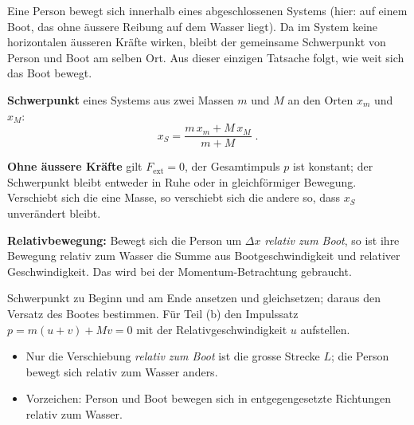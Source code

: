 
Eine Person bewegt sich innerhalb eines abgeschlossenen Systems (hier: auf
einem Boot, das ohne äussere Reibung auf dem Wasser liegt). Da im System
keine horizontalen äusseren Kräfte wirken, bleibt der gemeinsame Schwerpunkt
von Person und Boot am selben Ort. Aus dieser einzigen Tatsache folgt, wie
weit sich das Boot bewegt.

\begin{werkzeugkasten}[Werkzeuge]
\textbf{Schwerpunkt} eines Systems aus zwei Massen $m$ und $M$ an den Orten
$x_m$ und $x_M$:
\begin{equation}
  x_S = \frac{m\,x_m + M\,x_M}{m+M}\;.
\end{equation}

\textbf{Ohne äussere Kräfte} gilt $F_\mathrm{ext}=0$, der Gesamtimpuls $p$
ist konstant; der Schwerpunkt bleibt entweder in Ruhe oder in gleichförmiger
Bewegung. Verschiebt sich die eine Masse, so verschiebt sich die andere so,
dass $x_S$ unverändert bleibt.

\textbf{Relativbewegung:} Bewegt sich die Person um $\Delta x$ \emph{relativ
zum Boot}, so ist ihre Bewegung relativ zum Wasser die Summe aus
Bootgeschwindigkeit und relativer Geschwindigkeit. Das wird bei der
Momentum-Betrachtung gebraucht.
\end{werkzeugkasten}

\begin{werkzeugkasten}
Schwerpunkt zu Beginn und am Ende ansetzen und gleichsetzen; daraus den
Versatz des Bootes bestimmen. Für Teil (b) den Impulssatz
$p = m(u+v)+Mv = 0$ mit der Relativgeschwindigkeit $u$ aufstellen.
\end{werkzeugkasten}

\begin{achtung}
\begin{itemize}
  \item Nur die Verschiebung \emph{relativ zum Boot} ist die grosse Strecke
       $L$; die Person bewegt sich relativ zum Wasser anders.
  \item Vorzeichen: Person und Boot bewegen sich in entgegengesetzte
       Richtungen relativ zum Wasser.
\end{itemize}
\end{achtung}
